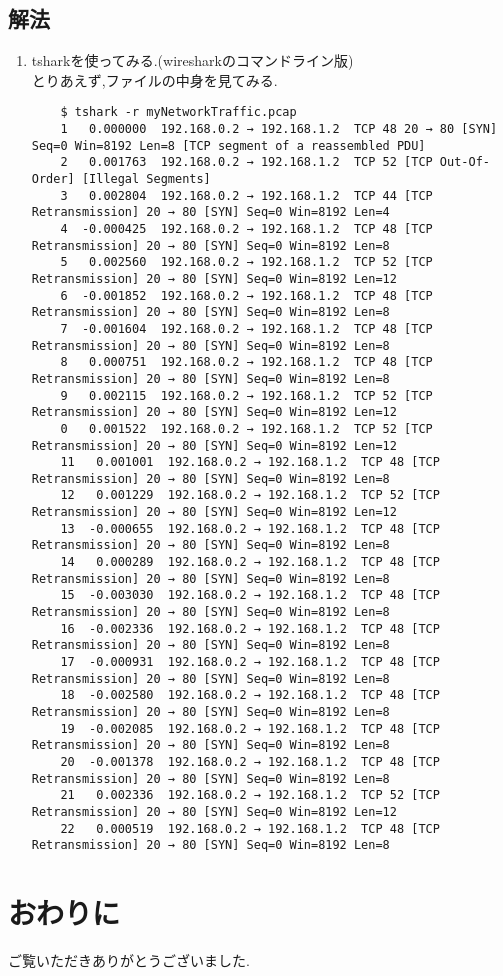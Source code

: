 \documentclass[dvipdfmx]{jsarticle}
\begin{document}
\subsection{解法}
\begin{enumerate}
	\item tsharkを使ってみる.(wiresharkのコマンドライン版)\\
	とりあえず,ファイルの中身を見てみる.
	\begin{verbatim}	
	$ tshark -r myNetworkTraffic.pcap
	1   0.000000  192.168.0.2 → 192.168.1.2  TCP 48 20 → 80 [SYN] Seq=0 Win=8192 Len=8 [TCP segment of a reassembled PDU]
	2   0.001763  192.168.0.2 → 192.168.1.2  TCP 52 [TCP Out-Of-Order] [Illegal Segments]
	3   0.002804  192.168.0.2 → 192.168.1.2  TCP 44 [TCP Retransmission] 20 → 80 [SYN] Seq=0 Win=8192 Len=4
	4  -0.000425  192.168.0.2 → 192.168.1.2  TCP 48 [TCP Retransmission] 20 → 80 [SYN] Seq=0 Win=8192 Len=8
	5   0.002560  192.168.0.2 → 192.168.1.2  TCP 52 [TCP Retransmission] 20 → 80 [SYN] Seq=0 Win=8192 Len=12
	6  -0.001852  192.168.0.2 → 192.168.1.2  TCP 48 [TCP Retransmission] 20 → 80 [SYN] Seq=0 Win=8192 Len=8
	7  -0.001604  192.168.0.2 → 192.168.1.2  TCP 48 [TCP Retransmission] 20 → 80 [SYN] Seq=0 Win=8192 Len=8
	8   0.000751  192.168.0.2 → 192.168.1.2  TCP 48 [TCP Retransmission] 20 → 80 [SYN] Seq=0 Win=8192 Len=8
	9   0.002115  192.168.0.2 → 192.168.1.2  TCP 52 [TCP Retransmission] 20 → 80 [SYN] Seq=0 Win=8192 Len=12
	0   0.001522  192.168.0.2 → 192.168.1.2  TCP 52 [TCP Retransmission] 20 → 80 [SYN] Seq=0 Win=8192 Len=12
	11   0.001001  192.168.0.2 → 192.168.1.2  TCP 48 [TCP Retransmission] 20 → 80 [SYN] Seq=0 Win=8192 Len=8
	12   0.001229  192.168.0.2 → 192.168.1.2  TCP 52 [TCP Retransmission] 20 → 80 [SYN] Seq=0 Win=8192 Len=12
	13  -0.000655  192.168.0.2 → 192.168.1.2  TCP 48 [TCP Retransmission] 20 → 80 [SYN] Seq=0 Win=8192 Len=8
	14   0.000289  192.168.0.2 → 192.168.1.2  TCP 48 [TCP Retransmission] 20 → 80 [SYN] Seq=0 Win=8192 Len=8
	15  -0.003030  192.168.0.2 → 192.168.1.2  TCP 48 [TCP Retransmission] 20 → 80 [SYN] Seq=0 Win=8192 Len=8
	16  -0.002336  192.168.0.2 → 192.168.1.2  TCP 48 [TCP Retransmission] 20 → 80 [SYN] Seq=0 Win=8192 Len=8
	17  -0.000931  192.168.0.2 → 192.168.1.2  TCP 48 [TCP Retransmission] 20 → 80 [SYN] Seq=0 Win=8192 Len=8
	18  -0.002580  192.168.0.2 → 192.168.1.2  TCP 48 [TCP Retransmission] 20 → 80 [SYN] Seq=0 Win=8192 Len=8
	19  -0.002085  192.168.0.2 → 192.168.1.2  TCP 48 [TCP Retransmission] 20 → 80 [SYN] Seq=0 Win=8192 Len=8
	20  -0.001378  192.168.0.2 → 192.168.1.2  TCP 48 [TCP Retransmission] 20 → 80 [SYN] Seq=0 Win=8192 Len=8
	21   0.002336  192.168.0.2 → 192.168.1.2  TCP 52 [TCP Retransmission] 20 → 80 [SYN] Seq=0 Win=8192 Len=12
	22   0.000519  192.168.0.2 → 192.168.1.2  TCP 48 [TCP Retransmission] 20 → 80 [SYN] Seq=0 Win=8192 Len=8	

	\end{verbatim}
\end{enumerate}
\section{おわりに}
ご覧いただきありがとうございました.
\end{document}
